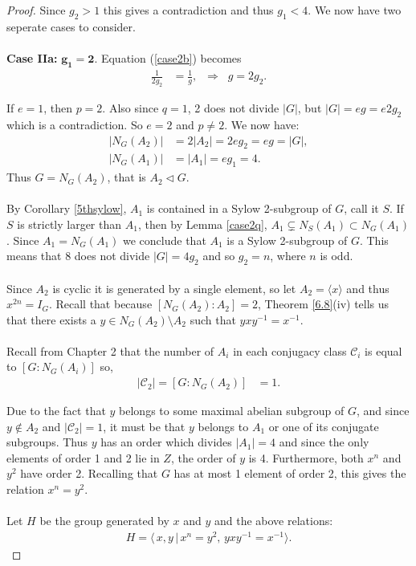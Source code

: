 \begin{proof}
Since $g_2 > 1$  this gives a contradiction and thus $g_1 < 4$. We now have two seperate cases to consider.\\
\\
 \space \textbf{Case IIa:} $\pmb{g_1 = 2}$. Equation (\ref{case2b}) becomes
\begin{align*} \frac{1}{2g_2} &= \frac{1}{g}, \; \; \Longrightarrow \; \; g = 2g_2.
\end{align*}

If $e=1$, then $p=2$. Also since $q=1$, 2 does not divide $|G|$, but $|G| = eg = e2g_2$ which is a contradiction. So $e=2$ and $p \neq 2$. We now have:
\begin{align*} |N_G(A_2)| &= 2|A_2|  = 2eg_2 = eg = |G|,  \tag{since $s+t = 2$}
\\ |N_G(A_1)| &= |A_1| = eg_1 = 4. \tag{since $s=1$} 
\end{align*}
Thus $G = N_G(A_2)$, that is $A_2 \vartriangleleft G$.\\
\\
By Corollary \ref{5thsylow}, $A_1$ is contained in a Sylow 2-subgroup of $G$, call it $S$. If $S$ is strictly larger than $A_1$, then by Lemma \ref{case2q}, $A_1 \subsetneq N_S(A_1) \subset N_G(A_1)$. Since $A_1 = N_G(A_1)$ we conclude that $A_1$ is a Sylow 2-subgroup of $G$. This means that 8 does not divide $|G| = 4g_2$ and so $g_2 = n$, where $n$ is odd. \\
\\
Since $A_2$ is cyclic it is generated by a single element, so let $A_2 = \langle x \rangle$ and thus $x^{2n}= I_G$.  Recall that because $[N_G(A_2): A_2] = 2$, Theorem \ref{6.8}(iv) tells us that there exists a $y \in N_G(A_2) \! \setminus \! A_2$ such that $yxy^{-1} = x^{-1}$. \\
\\
Recall from Chapter 2 that the number of $A_i$ in each conjugacy class $\mathcal{C}_i$ is equal to $[G : N_G(A_i)]$ so,
\begin{align*}  |\mathcal{C}_2| = [G:N_G(A_2)] &= 1.
\end{align*}

Due to the fact that $y$ belongs to some maximal abelian subgroup of $G$, and since $y \not \in A_2$ and $|\mathcal{C}_2| = 1$, it must be that $y$ belongs to $A_1$ or one of its conjugate subgroups. Thus $y$ has an order which divides $|A_1| = 4$ and since the only elements of order 1 and 2 lie in $Z$, the order of $y$ is 4. Furthermore, both $x^n$ and $y^2$ have order 2. Recalling that $G$ has at most 1 element of order 2, this gives the relation $x^n = y^2$. \\ 
\\
Let $H$ be the group generated by $x$ and $y$ and the above relations:
\begin{align*} H = \langle \, x,y \, | \, x^n = y^2, \, yxy^{-1} = x^{-1} \rangle.
\end{align*}


\end{proof}
